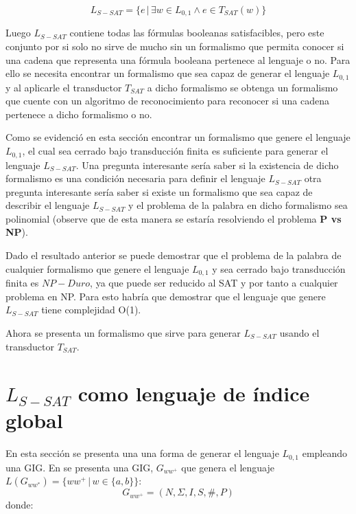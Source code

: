\documentclass[12pt]{article}
\begin{document}
$$L_{S-SAT} = \{e\,|\,\exists w \in L_{0,1} \wedge e \in T_{SAT}(w) \}$$

Luego $L_{S-SAT}$ contiene todas las fórmulas booleanas satisfacibles, pero este conjunto por si solo no sirve de mucho sin 
un formalismo que permita conocer si una cadena que representa una fórmula booleana pertenece al lenguaje o 
no. Para ello se necesita encontrar un formalismo que sea capaz de generar el lenguaje $L_{0,1}$ y al aplicarle el transductor 
$T_{SAT}$ a dicho formalismo se obtenga un formalismo que cuente con un algoritmo de reconocimiento para reconocer 
si una cadena pertenece a dicho formalismo o no.

Como se evidenció en esta sección encontrar un formalismo que genere el lenguaje $L_{0,1}$, el cual sea cerrado bajo transducción finita
es suficiente para generar el lenguaje $L_{S-SAT}$. Una pregunta interesante sería saber si la existencia de dicho formalismo
es una condición necesaria para definir el lenguaje $L_{S-SAT}$ otra pregunta interesante sería saber si existe un formalismo
que sea capaz de describir el lenguaje $L_{S-SAT}$ y el problema de la palabra en dicho formalismo sea polinomial (observe que de esta manera
se estaría resolviendo el problema \textbf{P vs NP}).

Dado el resultado anterior se puede demostrar que el problema de la palabra de cualquier formalismo que genere el lenguaje 
$L_{0,1}$ y sea cerrado bajo transducción finita es $NP-Duro$, ya que puede ser reducido al SAT y por tanto a cualquier problema
en NP. Para esto habría que demostrar que el lenguaje que genere $L_{S-SAT}$ tiene complejidad O(1).

Ahora se presenta un formalismo que sirve para generar $L_{S-SAT}$ usando el transductor $T_{SAT}$.

\section{$L_{S-SAT}$ como lenguaje de índice global}

En esta sección se presenta una una forma de generar el lenguaje $L_{0,1}$ empleando una GIG. En \cite{globalIndexLanguages} se presenta
una GIG, $G_{ww^+}$ que genera el lenguaje $L(G_{ww^*})=\{ww^+\,|\,w\in\{a,b\}\}$: 
$$
    G_{ww^+} = (N, \Sigma, I, S, \#, P) 
$$
donde:
\end{document}
